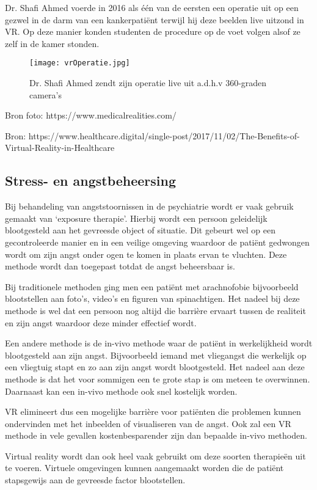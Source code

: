 Dr. Shafi Ahmed voerde in 2016  als één van de eersten een operatie uit op een gezwel in de darm van een kankerpatiënt terwijl hij deze beelden live uitzond in VR. Op deze manier konden studenten de procedure op de voet volgen alsof ze zelf in de kamer stonden.

\begin{figure}[h]
    \centering
    \texttt{[image: vrOperatie.jpg]}
    \caption{Dr. Shafi Ahmed zendt zijn operatie live uit a.d.h.v 360-graden camera's}
\end{figure}

Bron foto: https://www.medicalrealities.com/

Bron: https://www.healthcare.digital/single-post/2017/11/02/The-Benefits-of-Virtual-Reality-in-Healthcare

\subsection{Stress- en angstbeheersing}  
Bij behandeling van angststoornissen in de psychiatrie wordt er vaak gebruik gemaakt van ‘exposure therapie’. Hierbij wordt een persoon geleidelijk blootgesteld aan het gevreesde object of situatie. Dit gebeurt wel op een gecontroleerde manier en in een veilige omgeving waardoor de patiënt gedwongen wordt om zijn angst onder ogen te komen in plaats ervan te vluchten. Deze methode wordt dan toegepast totdat de angst beheersbaar is. 

Bij traditionele methoden ging men een patiënt met arachnofobie bijvoorbeeld blootstellen aan foto’s, video’s en figuren van spinachtigen. Het nadeel bij deze methode is wel dat een persoon nog altijd die barrière ervaart tussen de realiteit en zijn angst waardoor deze minder effectief wordt.

Een andere methode is de in-vivo methode waar de patiënt in werkelijkheid wordt blootgesteld aan zijn angst. Bijvoorbeeld iemand met vliegangst die werkelijk op een vliegtuig stapt en zo aan zijn angst wordt blootgesteld. Het nadeel aan deze methode is dat het voor sommigen een te grote stap is om meteen te overwinnen. Daarnaast kan een in-vivo methode ook snel kostelijk worden.

VR elimineert dus een mogelijke barrière voor patiënten die problemen kunnen ondervinden met het inbeelden of visualiseren van de angst. Ook zal een VR methode in vele gevallen kostenbesparender zijn dan bepaalde in-vivo methoden.

Virtual reality wordt dan ook heel vaak gebruikt om deze soorten therapieën uit te voeren. Virtuele omgevingen kunnen aangemaakt worden die de patiënt stapsgewijs aan de gevreesde factor blootstellen.

